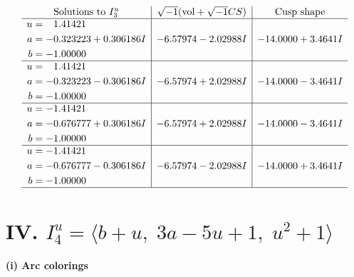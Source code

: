 \documentclass[1p]{elsarticle_modified}
\theoremstyle{definition}
\newcommand{\I}{\sqrt{-1}}
\begin{document}
$$\begin{array}{c|c|c}  
\text{Solutions to }I^u_{3}& \I (\text{vol} + \sqrt{-1}CS) & \text{Cusp shape}\\
 \hline 
\begin{aligned}
u &= \phantom{-}1.41421\phantom{ +0.000000I} \\
a &= -0.323223 + 0.306186 I \\
b &= -1.00000\phantom{ +0.000000I}\end{aligned}
 & -6.57974 - 2.02988 I & -14.0000 + 3.4641 I \\ \hline\begin{aligned}
u &= \phantom{-}1.41421\phantom{ +0.000000I} \\
a &= -0.323223 - 0.306186 I \\
b &= -1.00000\phantom{ +0.000000I}\end{aligned}
 & -6.57974 + 2.02988 I & -14.0000 - 3.4641 I \\ \hline\begin{aligned}
u &= -1.41421\phantom{ +0.000000I} \\
a &= -0.676777 + 0.306186 I \\
b &= -1.00000\phantom{ +0.000000I}\end{aligned}
 & -6.57974 + 2.02988 I & -14.0000 - 3.4641 I \\ \hline\begin{aligned}
u &= -1.41421\phantom{ +0.000000I} \\
a &= -0.676777 - 0.306186 I \\
b &= -1.00000\phantom{ +0.000000I}\end{aligned}
 & -6.57974 - 2.02988 I & -14.0000 + 3.4641 I\\
 \hline 
 \end{array}$$\newpage\newpage\renewcommand{\arraystretch}{1}
\centering \section*{IV. $I^u_{4}= \langle b+u,\;3 a-5 u+1,\;u^2+1 \rangle$}
\flushleft \textbf{(i) Arc colorings}\\
\end{document}
